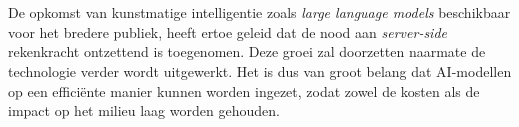 
%
%
%
%
%

%



\chapter*{}

De opkomst van kunstmatige intelligentie zoals \textit{large language models} beschikbaar voor het bredere publiek, heeft ertoe geleid dat de nood aan \textit{server-side} rekenkracht ontzettend is toegenomen. Deze groei zal doorzetten naarmate de technologie verder wordt uitgewerkt. Het is dus van groot belang dat AI-modellen op een efficiënte manier kunnen worden ingezet, zodat zowel de kosten als de impact op het milieu laag worden gehouden. 

